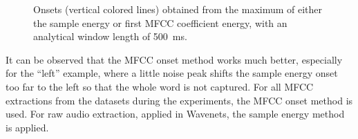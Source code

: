 \begin{figure}[!ht]
  \centering
  \caption{Onsets (vertical colored lines) obtained from the maximum of either the sample energy or first MFCC coefficient energy, with an analytical window length of \SI{500}{\milli\second}.}
  \label{fig:signal_onset_showcase}
\end{figure}
\FloatBarrier
\noindent
It can be observed that the MFCC onset method works much better, especially for the \enquote{left} example, where a little noise peak shifts the sample energy onset too far to the left so that the whole word is not captured.
For all MFCC extractions from the datasets during the experiments, the MFCC onset method is used. 
For raw audio extraction, applied in Wavenets, the sample energy method is applied.


